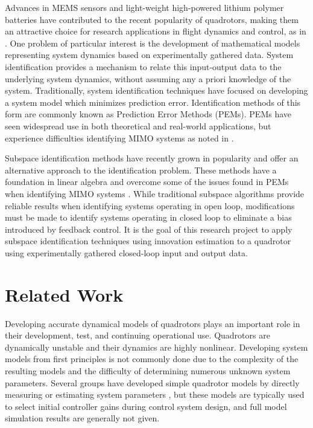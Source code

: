 Advances in MEMS sensors and light-weight high-powered lithium polymer batteries have contributed to the recent popularity of quadrotors, making them an attractive choice for research applications in flight dynamics and control, as in \cite{hoffmann2007quadrotor, kivrak2006design, mellinger2010control, michael2010grasp}. One problem of particular interest is the development of mathematical models representing system dynamics based on experimentally gathered data. System identification provides a mechanism to relate this input-output data to the underlying system dynamics, without assuming any a priori knowledge of the system. Traditionally, system identification techniques have focused on developing a system model which minimizes prediction error. Identification methods of this form are commonly known as Prediction Error Methods (PEMs). PEMs have seen widespread use in both theoretical and real-world applications, but experience difficulties identifying MIMO systems as noted in \cite{qin2006overview, viberg1995subspace}. 

Subspace identification methods have recently grown in popularity and offer an alternative approach to the identification problem. These methods have a foundation in linear algebra and overcome some of the issues found in PEMs when identifying MIMO systems \cite{katayama2005subspace}. While traditional subspace algorithms provide reliable results when identifying systems operating in open loop, modifications must be made to identify systems operating in closed loop to eliminate a bias introduced by feedback control. It is the goal of this research project to apply subspace identification techniques using innovation estimation to a quadrotor using experimentally gathered closed-loop input and output data.


\section{Related Work}
Developing accurate dynamical models of quadrotors plays an important role in their development, test, and continuing operational use. Quadrotors are dynamically unstable and their dynamics are highly nonlinear. Developing system models from first principles is not commonly done due to the complexity of the resulting models and the difficulty of determining numerous unknown system parameters. Several groups have developed simple quadrotor models by directly measuring or estimating system parameters \cite{bresciani2008modelling, domingues2009quadrotor, kivrak2006design, pounds2006modelling, schreier2012modeling}, but these models are typically used to select initial controller gains during control system design, and full model simulation results are generally not given. 

